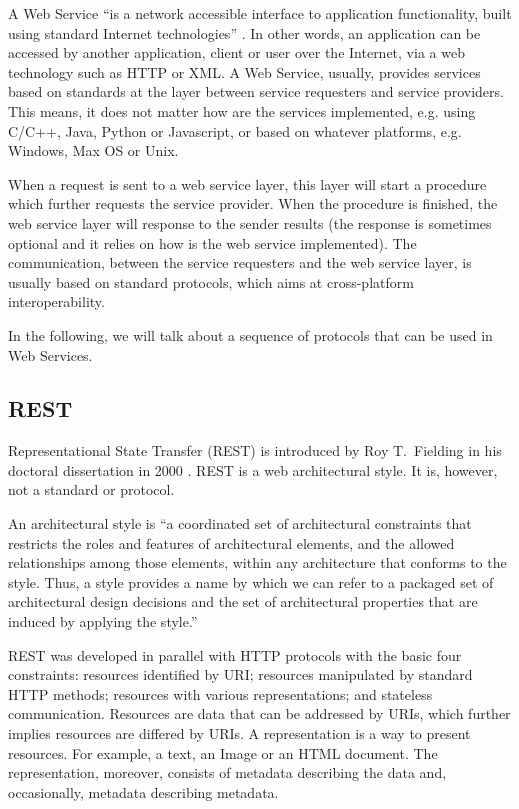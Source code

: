 A Web Service ``is a network accessible interface to application functionality, built using standard Internet technologies'' \cite{snell2009programming}. In other words, an application can be accessed by another application, client or user over the Internet, via a web technology such as HTTP or XML. A Web Service, usually, provides services based on standards at the layer between service requesters and service providers. This means, it does not matter how are the services implemented, e.g. using C/C++, Java, Python or Javascript, or based on whatever platforms, e.g. Windows, Max OS or Unix. 

When a request is sent to a web service layer, this layer will start a procedure which further requests the service provider. When the procedure is finished, the web service layer will response to the sender results (the response is sometimes optional and it relies on how is the web service implemented). The communication, between the service requesters and the web service layer, is usually based on standard protocols, which aims at cross-platform interoperability. 

In the following, we will talk about a sequence of protocols that can be used in Web Services.

\subsection{REST}
Representational State Transfer (REST) is introduced by Roy T.~Fielding in his doctoral dissertation in 2000 \cite{fielding2002principled}. REST is a web architectural style. It is, however, not a standard or protocol. 

An architectural style is ``a coordinated set of architectural constraints that restricts the roles and features of architectural elements, and the allowed relationships among those elements, within any architecture that conforms to the style. Thus, a style provides a name by which we can refer to a packaged set of architectural design decisions and the set of architectural properties that are induced by applying the style.'' \cite {fielding2002principled}

REST was developed in parallel with HTTP protocols with the basic four constraints: resources identified by URI; resources manipulated by standard HTTP methods; resources with various representations; and stateless communication. Resources are data that can be addressed by URIs, which further implies resources are differed by URIs. A representation is a way to present resources. For example, a text, an Image or an HTML document. The representation, moreover, consists of metadata describing the data and, occasionally, metadata describing metadata.

